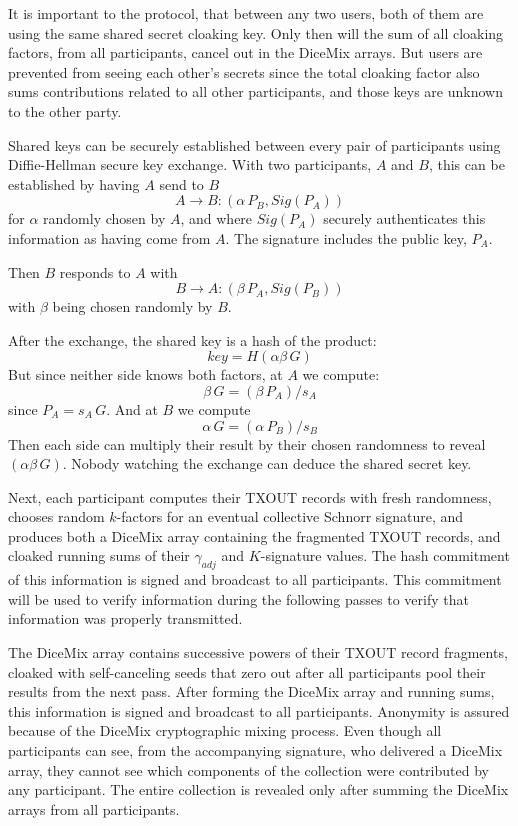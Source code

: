 \documentclass[a4paper, 10pt, conference]{ieeeconf}
\begin{document}
It is important to the protocol, that between any two users, both of them are using the same shared secret cloaking key. Only then will the sum of all cloaking factors, from all participants, cancel out in the DiceMix arrays. But users are prevented from seeing each other's secrets since the total cloaking factor also sums contributions related to all other participants, and those keys are unknown to the other party.

Shared keys can be securely established between every pair of participants using Diffie-Hellman secure key exchange. With two participants, $A$ and $B$, this can be established by having $A$ send to $B$
$$A \rightarrow B: (\alpha \, P_B, \mathit{Sig}(P_A))$$
for $\alpha$ randomly chosen by $A$, and where $\mathit{Sig}(P_A)$ securely authenticates this information as having come from $A$. The signature includes the public key, $P_A$. 

Then $B$ responds to $A$ with
$$B \rightarrow A: (\beta \, P_A, \mathit{Sig}(P_B))$$
with $\beta$ being chosen randomly by $B$. 

After the exchange, the shared key is a hash of the product:
$$key = H(\alpha \beta \, G)$$ 
But since neither side knows both factors, at $A$ we compute:
$$\beta \, G = (\beta \, P_A) / s_A$$
since $P_A = s_A \, G$. And at $B$ we compute
$$\alpha \, G = (\alpha \, P_B) / s_B$$
Then each side can multiply their result by their chosen randomness to reveal $(\alpha \beta \, G)$. Nobody watching the exchange can deduce the shared secret key.

Next, each participant computes their TXOUT records with fresh randomness, chooses random $k$-factors for an eventual collective Schnorr signature, and produces both a DiceMix array containing the fragmented TXOUT records, and cloaked running sums of their $\gamma_{\mathit{adj}}$ and $K$-signature values. The hash commitment of this information is signed and broadcast to all participants. This commitment will be used to verify information during the following passes to verify that information was properly transmitted.

The DiceMix array contains successive powers of their TXOUT record fragments, cloaked with self-canceling seeds that zero out after all participants pool their results from the next pass. After forming the DiceMix array and running sums, this information is signed and broadcast to all participants. Anonymity is assured because of the DiceMix cryptographic mixing process. Even though all participants can see, from the accompanying signature, who delivered a DiceMix array, they cannot see which components of the collection were contributed by any participant. The entire collection is revealed only after summing the DiceMix arrays from all participants.
\end{document}
